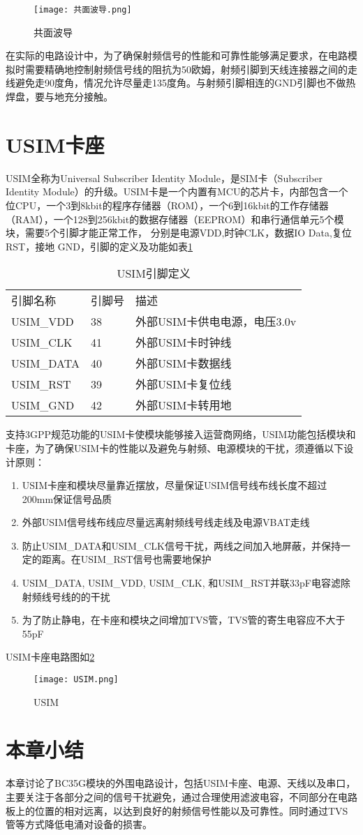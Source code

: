 \begin{figure}[H]
	\centering
	\texttt{[image: 共面波导.png]}
	\caption{共面波导}
	\label{共面波导}
\end{figure}

在实际的电路设计中，为了确保射频信号的性能和可靠性能够满足要求，在电路模拟时需要精确地控制射频信号线的阻抗为50欧姆，射频引脚到天线连接器之间的走线避免走90度角，情况允许尽量走135度角。与射频引脚相连的GND引脚也不做热焊盘，要与地充分接触。

\section{USIM卡座}
USIM全称为Universal Subscriber Identity Module，是SIM卡（Subscriber Identity Module）的升级。USIM卡是一个内置有MCU的芯片卡，内部包含一个
位CPU，一个3到8kbit的程序存储器（ROM），一个6到16kbit的工作存储器（RAM），一个128到256kbit的数据存储器（EEPROM）和串行通信单元5个模块，需要5个引脚才能正常工作，
分别是电源VDD,时钟CLK，数据IO Data,复位 RST，接地 GND，引脚的定义及功能如表\ref{USIM引脚定义}

\begin{table}[h!]
\caption{USIM引脚定义}
\begin{tabular}{lll}
\toprule
  引脚名称 & 引脚号 & 描述 \\
 USIM\_VDD & 38 & 外部USIM卡供电电源，电压3.0v \\
 USIM\_CLK  & 41  & 外部USIM卡时钟线  \\
 USIM\_DATA & 40 & 外部USIM卡数据线  \\
 USIM\_RST & 39 &  外部USIM卡复位线  \\
 USIM\_GND & 42 & 外部USIM卡转用地  \\
\bottomrule
\end{tabular}
\label{USIM引脚定义}
\end{table}

支持3GPP规范功能的USIM卡使模块能够接入运营商网络，USIM功能包括模块和卡座，为了确保USIM卡的性能以及避免与射频、电源模块的干扰，须遵循以下设计原则：

\begin{enumerate}
\item USIM卡座和模块尽量靠近摆放，尽量保证USIM信号线布线长度不超过200mm保证信号品质
\item 外部USIM信号线布线应尽量远离射频线号线走线及电源VBAT走线
\item 防止USIM\_DATA和USIM\_CLK信号干扰，两线之间加入地屏蔽，并保持一定的距离。在USIM\_RST信号也需要地保护
\item USIM\_DATA, USIM\_VDD, USIM\_CLK, 和USIM\_RST并联33pF电容滤除射频线号线的的干扰
\item 为了防止静电，在卡座和模块之间增加TVS管，TVS管的寄生电容应不大于55pF
\end{enumerate}


USIM卡座电路图如\ref{USIM}
\begin{figure}[H]
	\centering
	\texttt{[image: USIM.png]}
	\caption{USIM}
	\label{USIM}
\end{figure}

\section{本章小结}

本章讨论了BC35G模块的外围电路设计，包括USIM卡座、电源、天线以及串口，主要关注于各部分之间的信号干扰避免，通过合理使用滤波电容，不同部分在电路板上的位置的相对远离，以达到良好的射频信号性能以及可靠性。同时通过TVS管等方式降低电涌对设备的损害。